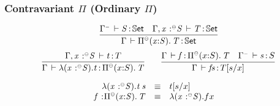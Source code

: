 \documentclass[11pt]{article}
\theoremstyle{plain}
\begin{document}
\subsubsection{Contravariant $\Pi$ (Ordinary $\Pi$)}
\begin{equation}
	\infer{
		\oftp{\Gamma}{\picon{x}{S}{T}}{\types}
	}{
		\oftp{\Gamma^\con}{S}{\types} &
		\oftp{\Gamma, \tpvar x \conc S}{T}{\types}
	}
\end{equation}
\begin{equation}
	\infer{
		\oftp{\Gamma}{\lacon x S t}{\picon{x}{S}{T}}
	}{
		\oftp{\Gamma, \tpvar x \conc S}{t}{T}
	}
	\qquad
	\infer{
		\oftp{\Gamma}{f s}{T[s/x]}
	}{
		\oftp{\Gamma}{f}{\picon{x}{S}{T}} &
		\oftp{\Gamma^\con}{s}{S}
	}
\end{equation}

\[
\begin{array}{rcll}
\mathit{\lambda(\mathit{x} \,^{\,}{:}^{{\text{\tiny $\mathord{\ominus}$}}} \mathit{S}).t \: s} & \equiv & t [ s / x ] \\
\mathit{f} \,^{\,}{:}^{} \mathit{\textnormal{$\Pi$}^{{\text{\tiny $\mathord{\ominus}$}}}(x \mathit{:} S).\,\mathit{T}} & \equiv & \lambda(\mathit{x} \,^{\,}{:}^{{\text{\tiny $\mathord{\ominus}$}}} \mathit{S}).fx &
\end{array} \\
\]
\end{document}

